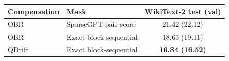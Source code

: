 \begin{tabular}{llc}
\toprule
Compensation & Mask & WikiText-2 test (val) \\
\midrule
OBR & SparseGPT pair score & 21.42 (22.12) \\
OBR & Exact block-sequential & 18.63 (19.11) \\
QDrift & Exact block-sequential & \textbf{16.34 (16.52)} \\
\bottomrule
\end{tabular}

